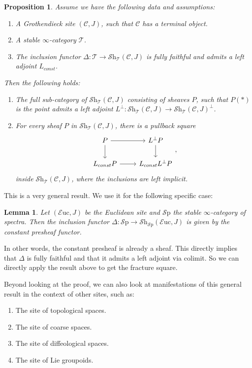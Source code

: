 \documentclass[a4paper]{book}
\newcommand{\lC}{\mathcal{C}}
\newcommand{\lE}{\mathcal{E}}
\newcommand{\lS}{\mathcal{S}}
\newcommand{\lT}{\mathcal{T}}
\newcommand{\Shv}{\lS\mathrm{h}} %
\newcommand{\Sp}{\lS\mathrm{p}} %
\newcommand{\Euc}{\lE\mathrm{uc}} %
\newtheorem{lemma}[equation]{Lemma}
\newtheorem{proposition}[equation]{Proposition}
\theoremstyle{definition}
\theoremstyle{remark}
\numberwithin{equation}{section}
\begin{document}
\begin{proposition}
  Assume we have the following data and assumptions:
  \begin{enumerate}
    \item A Grothendieck site $(\lC,J)$, such that $\lC$ has a terminal object.
    \item A stable $\infty$-category $\lT$.
    \item The inclusion functor $\Delta\colon \lT \to \Shv_\lT(\lC,J)$ is fully faithful and admits a left adjoint $L_{const}$. 
  \end{enumerate}
  Then the following holds:
  \begin{enumerate}
    \item The full sub-category of $\Shv_\lT(\lC,J)$ consisting of sheaves $P$, such that $P(*)$ is the point admits a left adjoint $L^{\bot}\colon \Shv_\lT(\lC,J) \to \Shv_\lT(\lC,J)^\bot$.
    \item For every sheaf $P$ in $\Shv_\lT(\lC,J)$, there is a pullback square
    \[
    \begin{tikzcd}
      P \arrow[r] \arrow[d] & L^{\bot}P \arrow[d] \\
      L_{const}P \arrow[r] & L_{const}L^{\bot}P
    \end{tikzcd},
    \]
    inside $\Shv_\lT(\lC,J)$, where the inclusions are left implicit.
  \end{enumerate} 
\end{proposition}

This is a very general result. We use it for the following specific case:
\begin{lemma}
 Let $(\Euc,J)$ be the Euclidean site and $\Sp$ the stable $\infty$-category of spectra. Then the inclusion functor $\Delta\colon \Sp \to \Shv_{\Sp}(\Euc,J)$ is given by the constant presheaf functor.
\end{lemma}

In other words, the constant presheaf is already a sheaf. This directly implies that $\Delta$ is fully faithful and that it admits a left adjoint via colimit. So we can directly apply the result above to get the fracture square.

Beyond looking at the proof, we can also look at manifestations of this general result in the context of other sites, such as:
\begin{enumerate}
  \item The site of topological spaces.
  \item The site of coarse spaces.
  \item The site of diffeological spaces.
  \item The site of Lie groupoids.
\end{enumerate}
\end{document}
